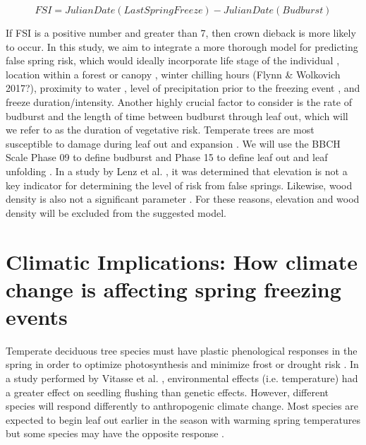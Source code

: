 \documentclass{article}\usepackage[]{graphicx}\usepackage[]{color}
\begin{document}
\[ FSI = Julian Date (Last Spring Freeze) - Julian Date (Budburst) \]

If FSI is a positive number and greater than 7, then crown dieback is more likely to occur. In this study, we aim to integrate a more thorough model for predicting false spring risk, which would ideally incorporate life stage of the individual \citep{Caffarra2011}, location within a forest or canopy \citep{Augspurger2013}
, winter chilling hours (Flynn \& Wolkovich 2017?), proximity to water \citep{Gu2008}
, level of precipitation prior to the freezing event \citep{Anderegg2013}, and freeze duration/intensity. Another highly crucial factor to consider is the rate of budburst and the length of time between budburst through leaf out, which will we refer to as the duration of vegetative risk. Temperate trees are most susceptible to damage during leaf out and expansion \citep{Vitasse2014}. We will use the BBCH Scale Phase 09 to define budburst and Phase 15 to define leaf out and leaf unfolding \citep{Meier2001}. In a study by Lenz et al. \citeyear{Lenz2016}, it was determined that elevation is not a key indicator for determining the level of risk from false springs. Likewise, wood density is also not a significant parameter \citep{Augspurger2009}. For these reasons, elevation and wood density will be excluded from the suggested model. 

\section{Climatic Implications: How climate change is affecting spring freezing events}
Temperate deciduous tree species must have plastic phenological responses in the spring in order to optimize photosynthesis and minimize frost or drought risk \citep{Polgar2011}. In a study performed by Vitasse et al. %
, environmental effects (i.e. temperature) had a greater effect on seedling flushing than genetic effects. However, different species will respond differently to anthropogenic climate change. Most species are expected to begin leaf out earlier in the season with warming spring temperatures but some species may have the opposite response \citep{Xin2016, Cleland2006, Yu2010}.
\end{document}
